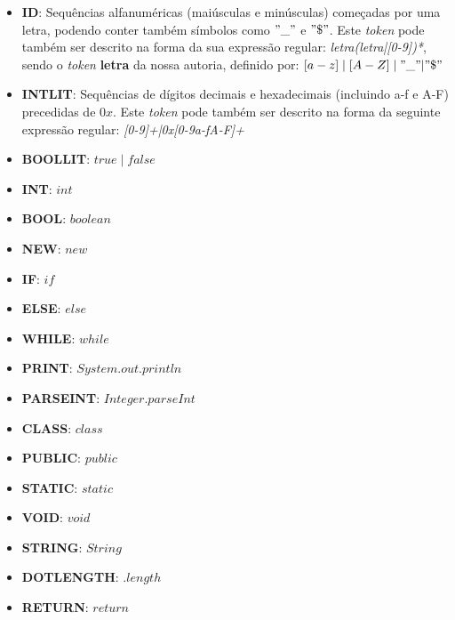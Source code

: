 \documentclass[11pt,a4paper]{article}
\begin{document}
	\begin{itemize}
	\item \textbf{ID}: Sequências alfanuméricas (maiúsculas e minúsculas) começadas por uma letra, podendo conter também símbolos como $"\_"$ e $"\$"$. Este \emph{token} pode também ser descrito na forma da sua expressão regular: \emph{{letra}({letra}|{[0-9]})*}, sendo o \emph{token} \textbf{letra} da nossa autoria, definido por: $[a-z] \mid [A-Z] \mid "\_"|"\$"$
	
	\item \textbf{INTLIT}: Sequências de dígitos decimais e hexadecimais (incluindo a-f e A-F) precedidas de $0x$. Este \emph{token} pode também ser descrito na forma da seguinte expressão regular: \emph{{[0-9]}+|0x[0-9a-fA-F]+}
	
	\item \textbf{BOOLLIT}: $true \mid false$
	
	\item \textbf{INT}: $int$
	
	\item \textbf{BOOL}: $boolean$
	
	\item \textbf{NEW}: $new$
	
	\item \textbf{IF}: $if$
	
	\item \textbf{ELSE}: $else$
	
	\item \textbf{WHILE}: $while$
	
	\item \textbf{PRINT}: $System.out.println$
	
	\item \textbf{PARSEINT}: $Integer.parseInt$
	
	\item \textbf{CLASS}: $class$
	
	\item \textbf{PUBLIC}: $public$
	
	\item \textbf{STATIC}: $static$
	
	\item \textbf{VOID}: $void$
	
	\item \textbf{STRING}: $String$
	
	\item \textbf{DOTLENGTH}: $.length$
	
	\item \textbf{RETURN}: $return$
	

\end{itemize}
\end{document}
